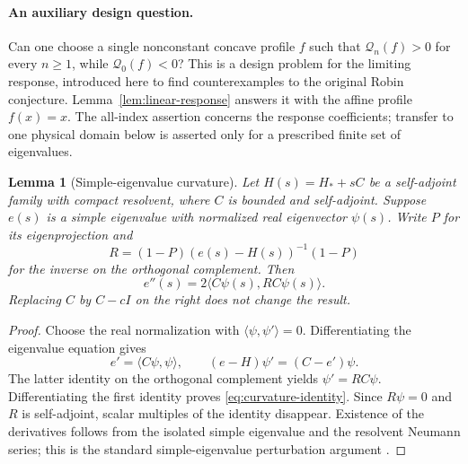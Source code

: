 \documentclass[11pt,a4paper]{article}
\newtheorem{lemma}[theorem]{Lemma}
\theoremstyle{definition}\newtheorem{definition}[theorem]{Definition}
\theoremstyle{remark}\newtheorem{remark}[theorem]{Remark}
\begin{document}
\paragraph{An auxiliary design question.}
Can one choose a single nonconstant concave profile $f$ such that
$\mathcal Q_n(f)>0$ for every $n\geq1$, while
$\mathcal Q_0(f)<0$? This is a design problem for the limiting
response, introduced here to find counterexamples to the original
Robin conjecture. Lemma~\ref{lem:linear-response} answers it with
the affine profile $f(x)=x$. The all-index assertion concerns
the response coefficients; transfer to one physical domain below
is asserted only for a prescribed finite set of eigenvalues.
\begin{lemma}[Simple-eigenvalue curvature]\label{lem:curvature-identity}
Let $H(s)=H_*+sC$ be a self-adjoint family with compact resolvent,
where $C$ is bounded and self-adjoint. Suppose $e(s)$ is a simple
eigenvalue with normalized real eigenvector $\psi(s)$. Write $P$
for its eigenprojection and
\[
 R=(1-P)(e(s)-H(s))^{-1}(1-P)
\]
for the inverse on the orthogonal complement. Then
\begin{equation}\label{eq:curvature-identity}
 e''(s)=2\langle C\psi(s),R C\psi(s)\rangle.
\end{equation}
Replacing $C$ by $C-cI$ on the right does not change the result.
\end{lemma}
\begin{proof}
Choose the real normalization with
$\langle\psi,\psi'\rangle=0$. Differentiating the eigenvalue
equation gives
\[
 e'=\langle C\psi,\psi\rangle,\qquad
 (e-H)\psi'=(C-e')\psi.
\]
The latter identity on the orthogonal complement yields
$\psi'=RC\psi$. Differentiating the first identity proves
\eqref{eq:curvature-identity}. Since $R\psi=0$ and $R$ is
self-adjoint, scalar multiples of the identity disappear.
Existence of the derivatives follows from the isolated simple
eigenvalue and the resolvent Neumann series; this is the standard
simple-eigenvalue perturbation argument \cite[Chapter~VII]{Kato}.
\end{proof}
\end{document}
